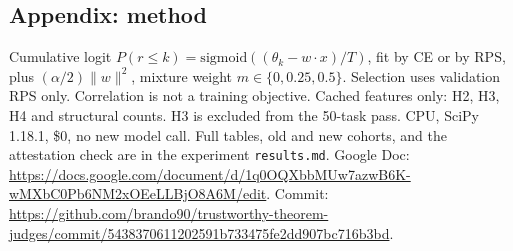 \subsection*{Appendix: method}
Cumulative logit \(P(r \le k) = \mathrm{sigmoid}((\theta_k - w \cdot x) / T)\), fit by CE or by RPS, plus \((\alpha/2) \lVert w \rVert^2\), mixture weight \(m \in \lbrace 0, 0.25, 0.5 \rbrace\). Selection uses validation RPS only. Correlation is not a training objective. Cached features only: H2, H3, H4 and structural counts. H3 is excluded from the 50-task pass. CPU, SciPy 1.18.1, \$0, no new model call. Full tables, old and new cohorts, and the attestation check are in the experiment \texttt{results.md}. Google Doc: \url{https://docs.google.com/document/d/1q0OQXbbMUw7azwB6K-wMXbC0Pb6NM2xOEeLLBjO8A6M/edit}. Commit: \url{https://github.com/brando90/trustworthy-theorem-judges/commit/5438370611202591b733475fe2dd907bc716b3bd}.
